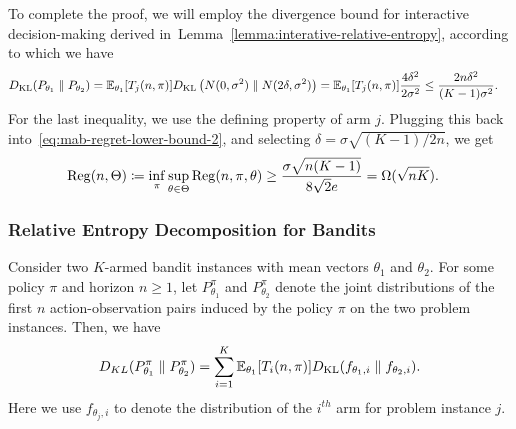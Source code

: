 \documentclass[12pt]{article}
\begin{document}
To complete the proof, we will employ the divergence bound for interactive decision-making derived in~Lemma~\ref{lemma:interative-relative-entropy}, according to which we have 
\begin{align}
D_{\text{KL}}(P_{\theta_1} \parallel P_{\theta_2}) & = \mathbb{E}_{\theta_1}[T_j(n, \pi)] D_{\text{KL}}\left( N(0, \sigma^2) \parallel N(2\delta, \sigma^2) \right) = \mathbb{E}_{\theta_1}[T_j(n, \pi)] \frac{4\delta^2}{2 \sigma^2}  
 \leq \frac{2 n \delta^2}{(K-1) \sigma^2}. 
\end{align}
For the last inequality, we use the defining property of arm $j$. Plugging this back into~\eqref{eq:mab-regret-lower-bound-2}, and selecting $\delta = \sigma \sqrt{(K-1)/2n}$, we get 
\begin{align}
\mathrm{Reg}(n, \Theta) \coloneqq \inf_{\pi} \sup_{\theta \in \Theta} \mathrm{Reg}(n, \pi, \theta) & \geq \frac{\sigma\sqrt{n(K-1)}}{8 \sqrt{2} e}  = \Omega(\sqrt{n K}). 
\end{align}

\subsubsection{Relative Entropy Decomposition for Bandits}
\label{subsubsec:relative-entropy-bandits}

\begin{lemma}
\label{lemma:interactive-relative-entropy} Consider two $K$-armed bandit instances with mean vectors $\theta_1$ and $\theta_2$. For some policy $\pi$ and horizon $n \geq 1$, let $P_{\theta_1}^{\pi}$ and $P_{\theta_2}^{\pi}$ denote the joint distributions of the first $n$ action-observation pairs induced by the policy $\pi$ on the two problem instances. Then, we have 
\begin{align}
D_{KL}(P_{\theta_1}^{\pi} \parallel P_{\theta_2}^{\pi}) = \sum_{i=1}^K \mathbb{E}_{\theta_1}[T_i(n, \pi)] D_{\text{KL}}(f_{\theta_1, i} \parallel f_{\theta_2, i}). 
\end{align}
Here we use $f_{\theta_j, i}$ to denote the distribution of the $i^{th}$ arm for problem instance $j$. 
\end{lemma}
\end{document}
